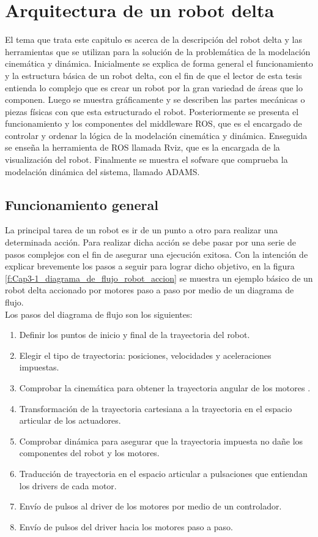 \chapter{Arquitectura de un robot delta}\label{CAP3}

El tema que trata este capitulo es acerca de la descripción del robot delta y las herramientas que se utilizan para la solución de la problemática de la modelación cinemática y dinámica. Inicialmente se explica de forma general el funcionamiento y la estructura básica de un robot delta, con el fin de que el lector de esta tesis entienda lo complejo que es crear un robot por la gran variedad de áreas que lo componen. Luego se muestra gráficamente y se describen las partes mecánicas o piezas físicas con que esta estructurado el robot. Posteriormente se presenta el funcionamiento y los componentes del middleware ROS, que es el encargado de controlar y ordenar la lógica de la modelación cinemática y dinámica. Enseguida se enseña la herramienta de ROS llamada Rviz, que es la encargada de la visualización del robot. Finalmente se muestra el sofware que comprueba la modelación dinámica del sistema, llamado ADAMS.

\section{Funcionamiento general}

La principal tarea de un robot es ir de un punto a otro para realizar una determinada acción. Para realizar dicha acción se debe pasar por una serie de pasos complejos con el fin de asegurar una ejecución exitosa. Con la intención de explicar brevemente los pasos a seguir para lograr dicho objetivo, en la figura \eqref{f:Cap3-1_diagrama_de_flujo_robot_accion} se muestra un ejemplo básico de un robot delta accionado por motores paso a paso por medio de un diagrama de flujo.\\

Los pasos del diagrama de flujo son los siguientes:

\begin{enumerate}
    \item Definir los puntos de inicio y final de la trayectoria del robot.
    \item Elegir el tipo de trayectoria: posiciones, velocidades y aceleraciones impuestas.
    \item Comprobar la cinemática para obtener la trayectoria angular de los motores .
    \item Transformación de la trayectoria cartesiana a la trayectoria en el espacio articular de los actuadores.    
    \item Comprobar dinámica para asegurar que la trayectoria impuesta no dañe los componentes del robot y los motores.
    \item Traducción de trayectoria en el espacio articular a pulsaciones que entiendan los drivers de cada motor.
    \item Envío de pulsos al driver de los motores por medio de un controlador.
    \item Envío de pulsos del driver hacia los motores paso a paso.
\end{enumerate}

